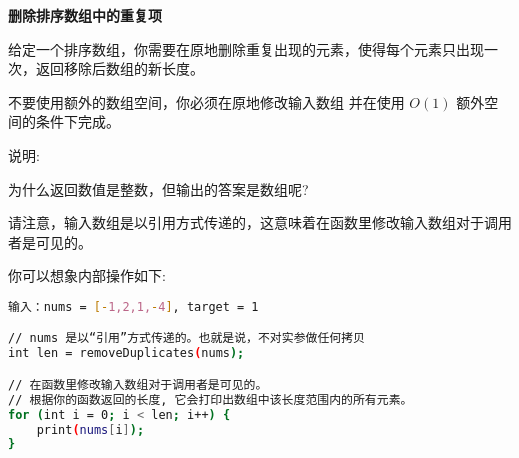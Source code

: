 \textbf{删除排序数组中的重复项}\par

给定一个排序数组，你需要在原地删除重复出现的元素，使得每个元素只出现一次，返回移除后数组的新长度。\par

不要使用额外的数组空间，你必须在原地修改输入数组 并在使用 $ O(1) $ 额外空间的条件下完成。\par

说明:\par

为什么返回数值是整数，但输出的答案是数组呢?\par

请注意，输入数组是以引用方式传递的，这意味着在函数里修改输入数组对于调用者是可见的。\par

你可以想象内部操作如下:\par

\begin{lstlisting}[language=bash]
输入：nums = [-1,2,1,-4], target = 1

// nums 是以“引用”方式传递的。也就是说，不对实参做任何拷贝
int len = removeDuplicates(nums);

// 在函数里修改输入数组对于调用者是可见的。
// 根据你的函数返回的长度, 它会打印出数组中该长度范围内的所有元素。
for (int i = 0; i < len; i++) {
    print(nums[i]);
}
\end{lstlisting}
